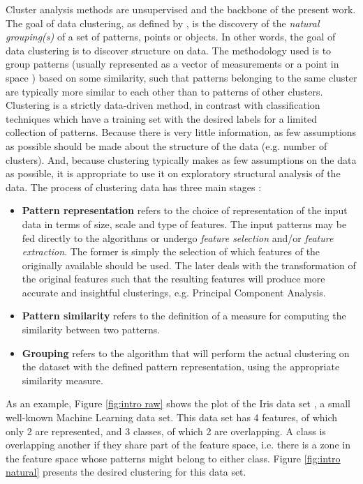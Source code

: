 Cluster analysis methods are unsupervised and the backbone of the present work.
The goal of data clustering, as defined by \cite{Jain2010}, is the discovery of the \textit{natural grouping(s)} of a set of patterns, points or objects.
In other words, the goal of data clustering is to discover structure on data.
The methodology used is to group patterns (usually represented as a vector of measurements or a point in space \cite{Jain1999}) based on some similarity, such that patterns belonging to the same cluster are typically more similar to each other than to patterns of other clusters.
Clustering is a strictly data-driven method, in contrast with classification techniques which have a training set with the desired labels for a limited collection of patterns.
Because there is very little information, as few assumptions as possible should be made about the structure of the data (e.g. number of clusters).
And, because clustering typically makes as few assumptions on the data as possible, it is appropriate to use it on exploratory structural analysis of the data.
The process of clustering data has three main stages \cite{Jain1999}:

\begin{itemize}
    \item \textbf{Pattern representation} refers to the choice of representation of the input data in terms of size, scale and type of features.
    The input patterns may be fed directly to the algorithms or undergo \emph{feature selection} and/or \emph{feature extraction}. The former is simply the selection of which features of the originally available should be used.
    The later deals with the transformation of the original features such that the resulting features will produce more accurate and insightful clusterings, e.g. Principal Component Analysis.

    \item \textbf{Pattern similarity} refers to the definition of a measure for computing the similarity between two patterns.
    \item \textbf{Grouping} refers to the algorithm that will perform the actual clustering on the dataset with the defined pattern representation, using the appropriate similarity measure.
\end{itemize}

As an example, Figure \ref{fig:intro raw} shows the plot of the Iris data set \cite{anderson1936species,fisher1936use}, a small well-known Machine Learning data set.
This data set has 4 features, of which only 2 are represented, and 3 classes, of which 2 are overlapping.
A class is overlapping another if they share part of the feature space, i.e. there is a zone in the feature space whose patterns might belong to either class.
Figure \ref{fig:intro natural} presents the desired clustering for this data set.

